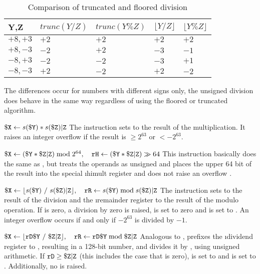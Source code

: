 \begin{table}[h]
	\begin{tabular}{| >{\centering}p{20mm} | >{\centering}p{26mm} | >{\centering}p{26mm} | >{\centering}p{26mm} | >{\centering}p{26mm} |}
		\hline
		\textbf{Y,Z} &
		\textbf{$trunc(Y / Z)$} & \textbf{$trunc(Y \% Z)$} &
		\textbf{$\lfloor Y / Z \rfloor$} & \textbf{$\lfloor Y \% Z \rfloor$}
		\tabularnewline
		\hline
		$+8,+3$ & $+2$ & $+2$ & $+2$ & $+2$
		\tabularnewline
		\hline
		$+8,-3$ & $-2$ & $+2$ & $-3$ & $-1$
		\tabularnewline
		\hline
		$-8,+3$ & $-2$ & $-2$ & $-3$ & $+1$
		\tabularnewline
		\hline
		$-8,-3$ & $+2$ & $-2$ & $+2$ & $-2$
		\tabularnewline
		\hline
	\end{tabular}
	\caption{Comparison of truncated and floored division \citep[pg. 3]{divmod}}
\end{table}
\noindent The differences occur for numbers with different signs only, \ie the unsigned division does behave in the same way regardless of using the floored or truncated algorithm.

\instrtbl
	{}
	{${\tt \$X} \leftarrow s({\tt \$Y}) * s({\tt \$Z}){\tt|Z}$}
\noindent The  instruction sets  to the result of the multiplication. It raises an integer overflow  if the result is $\ge 2^{63}$ or $< -2^{63}$. \citep[pg. 14]{mmix-doc}

\instrtbl
	{}
	{${\tt \$X} \leftarrow ({\tt \$Y} * {\tt \$Z}{\tt|Z}) \bmod 2^{64},\quad
	{\tt rH} \leftarrow ({\tt \$Y} * {\tt \$Z}{\tt|Z}) \gg 64$}
\noindent This instruction basically does the same as , but treats the operands as unsigned and places the upper 64 bit of the result into the special \i{himult register}  and does not raise an overflow . \citep[pg. 14]{mmix-doc}

\instrtbl
	{}
	{${\tt \$X} \leftarrow \lfloor s({\tt \$Y})~/~s({\tt \$Z}){\tt|Z}\rfloor,\quad
	{\tt rR} \leftarrow s({\tt \$Y}) \bmod s({\tt \$Z}){\tt|Z}$}
\noindent The instruction  sets  to the result of the division and the \i{remainder register}  to the result of the modulo operation. If  is zero, a division by zero  is raised,  is set to zero and  is set to . An integer overflow  occurs if and only if $-2^{63}$ is divided by $-1$. \citep[pg. 14]{mmix-doc}

\instrtbl
	{}
	{${\tt \$X} \leftarrow \lfloor {\tt rD}{\tt \$Y}~/~{\tt \$Z}{\tt|Z}\rfloor,\quad
	{\tt rR} \leftarrow {\tt rD}{\tt \$Y} \bmod {\tt \$Z}{\tt|Z}$}
\noindent Analogous to ,  prefixes the \i{dividend register}  to , resulting in a 128-bit number, and divides it by , using unsigned arithmetic. If ${\tt rD} \ge {\tt \$Z}{\tt|Z}$ (this includes the case that  is zero),  is set to  and  is set to . Additionally, no  is raised. \citep[pg. 14]{mmix-doc}

